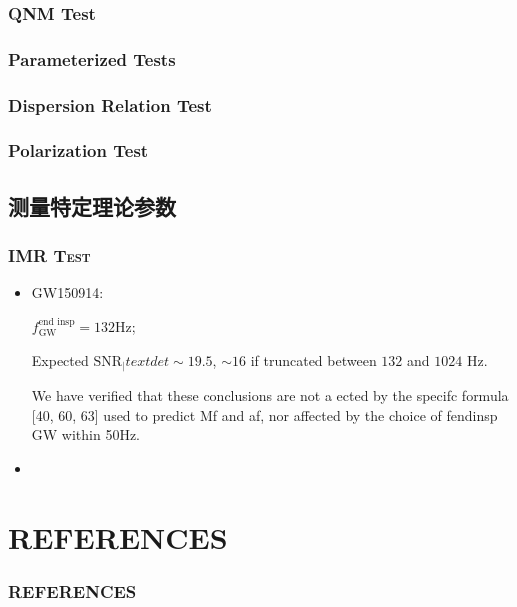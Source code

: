\documentclass[CJK,aspectratio=169]{beamer}  %
\begin{document}
\subsubsection{QNM Test}


\subsubsection{Parameterized Tests}


\subsubsection{Dispersion Relation Test}


\subsubsection{Polarization Test}


\subsection{测量特定理论参数}
\begin{frame}
	\frametitle{\textsc{IMR Test}}
	\begin{itemize}
		\item[1. ] GW150914\cite{test_GR_GW150914}: 
			\par $f_\text{GW}^\text{end insp} = 132 \text{Hz}$;
			\par Expected $\text{SNR}_|text{det} \sim 19.5$, $\sim 16$ if truncated between $132$ and $1024$ Hz.
			\par We have verified that these conclusions are not a ected by the specifc formula [40, 60, 63] used to predict Mf and af, nor affected by the choice of fendinsp GW within 50Hz.
		\item[2. ]
	\end{itemize}
\end{frame}


\section{\bf REFERENCES}
\begin{frame}[allowframebreaks]
	\frametitle{\textsc{REFERENCES}}
	
	
\end{frame}
\end{document}
